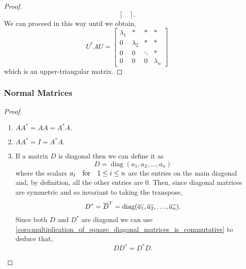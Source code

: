 \documentclass[../MathsNotesBase.tex]{subfiles}
\begin{document}
{\begin{proof}
\[\begin{bmatrix}
							\end{bmatrix}. 
			\]
			We can proceed in this way until we obtain,
			\[
				U^* A U = 	\begin{bmatrix}
								\lambda_1 & * 		  & * 	   & * \\
								0		  & \lambda_2 & * 	   & * \\
								0 		  & 0		  & \ddots & * \\
								0		  & 0		  & 0	   & \lambda_n
							\end{bmatrix}
			\]
			which is an upper-triangular matrix.
		\end{proof}
	
	
	
		\biggerskip
		\subsubsection{Normal Matrices}
		\label{def:normal-matrix}
		
		\medskip
		\begin{proof}
			\begin{enumerate}[label=(\roman*)]
				\item{${ A A^* = A A = A^* A. }$}
				\item{${ A A^* = I = A^* A. }$}
				\item{If a matrix $D$ is diagonal then we can define it as
					\[ D = \operatorname{diag}(a_1, a_2, \dots, a_n) \]
					where the scalars ${ a_i \hspace{10pt}\text{for}\hspace{10pt} 1 \leq i \leq n }$ are the entries on the main diagonal and, by definition, all the other entries are 0. Then, since diagonal matrices are symmetric and so invariant to taking the transpose,
					\[ D^* = \overline{D}^T = \operatorname{diag}(\overline{a_1}, \overline{a_2}, \dots, \overline{a_n}). \]
					Since both $D$ and $D^*$ are diagonal we can use \ref{coro:multiplication_of_square_diagonal_matrices_is_commutative} to deduce that,
					\[ D D^* = D^* D. \]
				}
			\end{enumerate}
		\end{proof}
	
}
\end{document}
